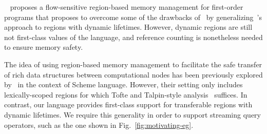 ~\cite{HMN01} proposes a flow-sensitive region-based memory management
for first-order programs that proposes to overcome some of the
drawbacks of~\cite{tofte97} by generalizing~\cite{tofte97}'s approach
to regions with dynamic lifetimes. However, dynamic regions are still
not first-class values of the language, and reference counting is
nonetheless needed to ensure memory safety.



The idea of using region-based memory management to facilitate the
safe transfer of rich data structures between computational nodes has
been previously explored by~\cite{gpu14} in the context of Scheme
language. However, their setting only includes lexically-scoped
regions for which Tofte and Talpin-style analysis~\cite{tofte97}
suffices. In contrast, our language provides first-class support for
transferable regions with dynamic lifetimes. We require this
generality in order to support streaming query operators, such as the
one shown in Fig.~\ref{fig:motivating-eg}. 

